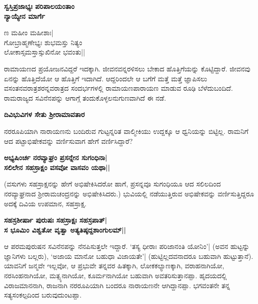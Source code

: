 \begin{center} 

{\bf ಸ್ವಸ್ತಿಪ್ರಜಾಭ್ಯಃ ಪರಿಪಾಲಯಂತಾಂ\\ 

ನ್ಯಾಯ್ಯೇನ ಮಾರ್ಗೆ

ಣ ಮಹೀಂ ಮಹೀಶಾಃ|\\ 

ಗೋಬ್ರಾಹ್ಮಣೇಭ್ಯಃ ಶುಭಮಸ್ತು ನಿತ್ಯಂ\\ 

ಲೋಕಾಸ್ಸಮಸ್ತಾಸ್ಸುಖಿನೋ ಭವಂತು||} 

\end{center} 


ರಾಮಾಯಣದ ಪ್ರಯೋಜನವಿದ್ದರೆ ಇದಕ್ಕಾಗಿ. ಜೀವನವನ್ನರಳಿಸಲು ಬೇಕಾದ ಹೊತ್ತಿಗೆಯನ್ನು ಕೊಟ್ಟಿದ್ದಾರೆ. ಜೀವನವು ಏನನ್ನು ಹೊತ್ತಿದೆಯೋ ಆ ಹೊತ್ತಿಗೆ ಇದಾಗಿದೆ. ಆದ್ದರಿಂದಲೇ ಆ ಬಗೆಗೆ ಮತ್ತೆ ಮತ್ತೆ ಜ್ಞಾಪಿಸಲು ವಸಂತನವರಾತ್ರಶರನ್ನವರಾತ್ರದ ಸಂದರ್ಭಗಳಲ್ಲಿ ರಾಮಾಯಣಪಾರಾಯಣ ಮಾಡುವ ರೂಢಿ ಬೆಳೆದುಬಂದಿದೆ. ರಾಮರಾಜ್ಯದ ಸವಿನೆನಪನ್ನು ಆಗಾಗ್ಗೆ ತಂದುಕೊಳ್ಳಲನುಗುಣವಾಗಿದೆ ಈ ನಡೆ. 


\large{\bf{ದಿವಿಭುವಿಗಳ ಸೇತು ಶ್ರೀರಾಮಾವತಾರ}} 


ನರರೂಪಿಯಾಗಿ ನಾರಾಯಣನು ಬಂದಿರುವ ಗುಟ್ಟನ್ನರಿತ ವಾಲ್ಮೀಕಿಯು ಉದ್ದಕ್ಕೂ ಆ ಧ್ವನಿಯನ್ನು ಬಿಟ್ಟಿಲ್ಲ. ರಾಮನಿಗೆ ಆದ ಪಟ್ಟಾಭಿಷೇಕವನ್ನು ವರ್ಣಿಸುವಾಗ ಹೇಗೆ ವರ್ಣಿಸಿದ್ದಾರೆ? 


\begin{center} 

{\bf ಅಭ್ಯಷಿಂರ್ಚ ನರವ್ಯಾಘ್ರಂ ಪ್ರಸನ್ನೇನ ಸುಗಂಧಿನಾ|\\ 

ಸಲಿಲೇನ ಸಹಸ್ರಾಕ್ಷಂ ವಸವೋ ವಾಸವಂ ಯಥಾ||} 

\end{center} 


(ವಸುಗಳು ಸಹಸ್ರಾಕ್ಷನನ್ನು ಹೇಗೆ ಅಭಿಷೇಕಿಸಿದರೋ ಹಾಗೆ, ಪ್ರಸನ್ನವೂ ಸುಗಂಧಿಯೂ ಆದ ಸಲಿಲದಿಂದ ನರವ್ಯಾಘ್ರನಾದ ಶ್ರೀರಾಮಚಂದ್ರನನ್ನು ಅಭಿಷೇಕಿಸಿದರು.) ಭುವಿಯಲ್ಲಿ ನಡೆಯುತ್ತಿರುವ ಅಭಿಷೇಕವನ್ನು ವರ್ಣಿಸುತ್ತಿದ್ದರೂ ಅದಕ್ಕೆ ದಿವಿಯ ಉಪಮಾನ, ಸಹಸ್ರಾಕ್ಷ. 


\begin{center} 

{\bf ಸಹಸ್ರಶೀರ್ಷಾ ಪುರುಷಃ ಸಹಸ್ರಾಕ್ಷಃ ಸಹಸ್ರಪಾತ್‍|\\ 

ಸ ಭೂಮಿಂ ವಿಶ್ವತೋ ವೃತ್ವಾ ಅತ್ಯತಿಷ್ಠದ್ದಶಾಂಗುಲಮ್‍||} 

\end{center} 


ಆ ಪರಮಪುರುಷನ ಸವಿನೆನಪನ್ನು ನೆನಪಿಸುತ್ತಲೇ ಇದ್ದಾರೆ. `ತಸ್ಯ ಧೀರಾಃ ಪರಿಜಾನಂತಿ ಯೋನಿಂ'| (ಅವನ ಹುಟ್ಟನ್ನು ಜ್ಞಾನಿಗಳು ಬಲ್ಲರು), `ಅಜಾಯ ಮಾನೋ ಬಹುಧಾ ವಿಜಾಯತೇ'| (ಹುಟ್ಟಿಲ್ಲದವನಾದರೂ ಬಹುವಾಗಿ ಹುಟ್ಟುತ್ತಾನೆ). ಯಾವನಿಗೆ ಜನ್ಮವೇ ಇಲ್ಲವೋ, ಆ ಪ್ರಭುವೇ ತನ್ನವರ ಹಿತಕ್ಕಾಗಿ, ಲೋಕಕಲ್ಯಾಣಕ್ಕಾಗಿ, ವರಾಹನಾಗಿಯೋ, ನರಸಿಂಹನಾಗಿಯೋ, ಮತ್ಸ್ಯನಾಗಿಯೋ, ಕೂರ್ಮನಾಗಿಯೋ ಬಹುವಾಗಿ ಅವತರಿಸುತ್ತಾನಪ್ಪಾ. ಹೃದಯದಲ್ಲಿ ವಿರಾಜಮಾನನಾಗಿ, ರಾಜನಾಗಿ ನರರೂಪಿಯಾಗಿ ಬಂದರೂ ನಾರಾಯಣನೇ ಆಗಿದ್ದಾನಪ್ಪಾ. ಭಗವಂತನೇ ತನ್ನ ಸತ್ಯಸಂಕಲ್ಪದಿಂದ ಬರುವುದುಂಟಪ್ಪಾ. 


